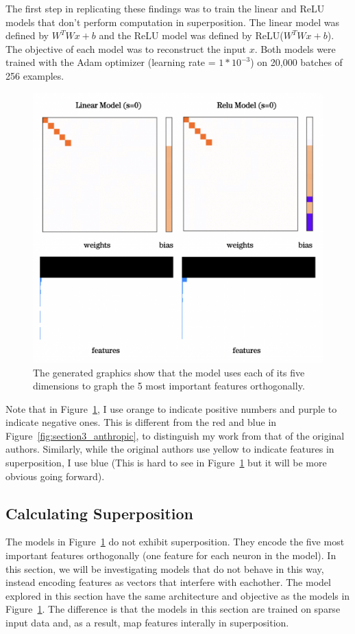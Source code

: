 \documentclass{article} %
\begin{document}
The first step in replicating these findings was to train the linear and ReLU
models that don't perform computation in superposition. The linear model was
defined by $W^TWx + b$ and the ReLU model was defined by ReLU($W^TWx + b$). The
objective of each model was to reconstruct the input $x$. Both 
models were trained with the Adam optimizer (learning rate = $1*10^{-3}$) on 
20,000 batches of 256 examples.

\begin{figure}[h]
    \centering
    \includegraphics[width=0.4\linewidth]{demonstrating_superposition/images/relu_linear_0_sparsity.png}
    \captionsetup{font=footnotesize, width=0.7\linewidth} %
    \caption{The generated graphics show that the model uses each of its five 
    dimensions to graph the 5 most important features orthogonally.}
    \label{fig:relu_linear_0}
\end{figure}

Note that in Figure~\ref{fig:relu_linear_0}, I use orange to indicate
positive numbers and purple to indicate negative ones. This is different from
the red and blue in Figure~\ref{fig:section3_anthropic}, to distinguish my work 
from that of the original authors. Similarly, while the original authors use 
yellow to indicate features in superposition, I use blue (This is hard to see in 
Figure~\ref{fig:relu_linear_0} but it will be more obvious going forward).

\subsection{Calculating Superposition}
\label{sec:calc_super}

The models in Figure~\ref{fig:relu_linear_0} do not exhibit superposition. They
encode the five most important features orthogonally (one feature for each
neuron in the model). In this section, we will be investigating models
that do not behave in this way, instead encoding features as vectors that interfere
with eachother. The model explored in this section have the same architecture
and objective as the models in Figure~\ref{fig:relu_linear_0}. The difference
is that the models in this section are trained on sparse input data and, as a
result, map features interally in superposition. \\
\end{document}
